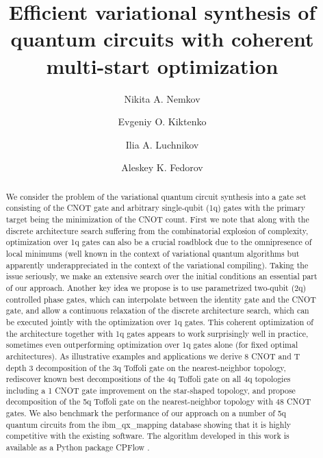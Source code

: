 \documentclass[draft, twocolumn, amsfonts, amssymb, aps, nofootinbib]{revtex4-2}
\newcommand{\CX}{\textsf{CNOT }}
\newcommand{\T}{\textsf{T }}
\newcommand{\package}[1]{\textrm {#1 }}
\newcommand{\cpflow}{\package{CPFlow}}
\begin{document}
\title{Efficient variational synthesis of quantum circuits with coherent multi-start optimization}

\author{Nikita A. Nemkov}
\author{Evgeniy O. Kiktenko}
\author{Ilia A. Luchnikov}
\author{Aleskey K. Fedorov}

\begin{abstract}
We consider the problem of the variational quantum circuit synthesis into a gate set consisting of the \CX gate and arbitrary single-qubit (1q) gates with the primary target being the minimization of the \CX count. First we note that along with the discrete architecture search suffering from the combinatorial explosion of complexity, optimization over 1q gates can also be a crucial roadblock due to the omnipresence of local minimums (well known in the context of variational quantum algorithms but apparently underappreciated in the context of the variational compiling). Taking the issue seriously, we make an extensive search over the initial conditions an essential part of our approach.
Another key idea we propose is to use parametrized two-qubit (2q) controlled phase gates, which can interpolate between the identity gate and the \CX gate, and allow a continuous relaxation of the discrete architecture search, which can be executed jointly with the optimization over 1q gates. This coherent optimization of the architecture together with 1q gates appears to work surprisingly well in practice, sometimes even outperforming optimization over 1q gates alone (for fixed optimal architectures).
As illustrative examples and applications we derive 8 \CX and \T depth 3 decomposition of the 3q Toffoli gate on the nearest-neighbor topology, rediscover known best decompositions of the 4q Toffoli gate on all 4q topologies including a  1 \CX gate improvement on the star-shaped topology, and propose decomposition of the 5q Toffoli gate on the nearest-neighbor topology with 48 \CX gates. We also benchmark the performance of our approach on a number of 5q quantum circuits from the ibm\_qx\_mapping database showing that it is highly competitive with the existing software. The algorithm developed in this work is available as a Python package \cpflow.
\end{abstract}
\end{document}
